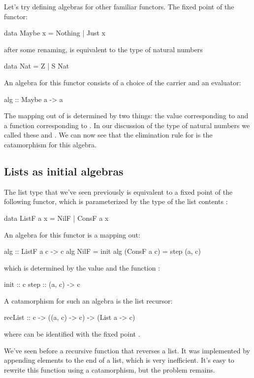 \documentclass[DaoFP]{subfiles}
\begin{document}
Let's try defining algebras for other familiar functors. The fixed point of the  functor:
\begin{haskell}
data Maybe x = Nothing | Just x
\end{haskell}
after some renaming, is equivalent to the type of natural numbers
\begin{haskell}
data Nat = Z | S Nat
\end{haskell}
An algebra for this functor consists of a choice of the carrier  and an evaluator:
\begin{haskell}
alg :: Maybe a -> a
\end{haskell}
The mapping out of  is determined by two things: the value corresponding to  and a function  corresponding to . In our discussion of the type of natural numbers we called these  and . We can now see that the elimination rule for  is the catamorphism for this algebra.

\subsection{Lists as initial algebras}

The list type that we've seen previously is equivalent to a fixed point of the following functor, which is parameterized by the type of the list contents :
\begin{haskell}
data ListF a x = NilF | ConsF a x
\end{haskell}
An algebra for this functor is a mapping out:
\begin{haskell}
alg :: ListF a c -> c
alg NilF = init
alg (ConsF a c) = step (a, c)
\end{haskell}
which is determined by the value  and the function :
\begin{haskell}
init :: c
step :: (a, c) -> c
\end{haskell}
A catamorphism for such an algebra is the list recursor:
\begin{haskell}
recList :: c -> ((a, c) -> c) -> (List a -> c)
\end{haskell}
where  can be identified with the fixed point .

We've seen before a recursive function that reverses a list. It was implemented by appending elements to the end of a list, which is very inefficient. It's easy to rewrite this function using a catamorphism, but the problem remains. 
\end{document}
